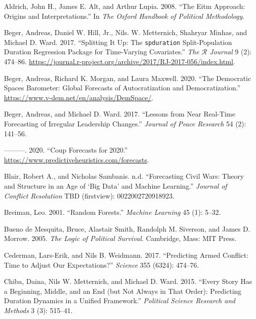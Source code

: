 \documentclass[
]{article}
\newlength{\cslhangindent}
\newenvironment{cslreferences}%
  {\setlength{\parindent}{0pt}%
  \everypar{\setlength{\hangindent}{\cslhangindent}}\ignorespaces}%
  {\par}
\begin{document}
\hypertarget{refs}{}
\begin{cslreferences}
\leavevmode\hypertarget{ref-aldrich:etal:2008}{}%
Aldrich, John H., James E. Alt, and Arthur Lupia. 2008. ``The Eitm Approach: Origins and Interpretations.'' In \emph{The Oxford Handbook of Political Methodology}.

\leavevmode\hypertarget{ref-beger:etal:2017}{}%
Beger, Andreas, Daniel W. Hill, Jr., Nils. W. Metternich, Shahryar Minhas, and Michael D. Ward. 2017. ``Splitting It Up: The \texttt{spduration} Split-Population Duration Regression Package for Time-Varying Covariates.'' \emph{The \(\mathcal{R}\) Journal} 9 (2): 474--86. \url{https://journal.r-project.org/archive/2017/RJ-2017-056/index.html}.

\leavevmode\hypertarget{ref-beger:etal:2020}{}%
Beger, Andreas, Richard K. Morgan, and Laura Maxwell. 2020. ``The Democratic Spaces Barometer: Global Forecasts of Autocratization and Democratization.'' \url{https://www.v-dem.net/en/analysis/DemSpace/}.

\leavevmode\hypertarget{ref-beger:ward:2017}{}%
Beger, Andreas, and Michael D. Ward. 2017. ``Lessons from Near Real-Time Forecasting of Irregular Leadership Changes.'' \emph{Journal of Peace Research} 54 (2): 141--56.

\leavevmode\hypertarget{ref-beger:ward:2020}{}%
---------. 2020. ``Coup Forecasts for 2020.'' \url{https://www.predictiveheuristics.com/forecasts}.

\leavevmode\hypertarget{ref-blair:sambanis:2020}{}%
Blair, Robert A., and Nicholas Sambanis. n.d. ``Forecasting Civil Wars: Theory and Structure in an Age of `Big Data' and Machine Learning.'' \emph{Journal of Conflict Resolution} TBD (firstview): 0022002720918923.

\leavevmode\hypertarget{ref-breiman:2001}{}%
Breiman, Leo. 2001. ``Random Forests.'' \emph{Machine Learning} 45 (1): 5--32.

\leavevmode\hypertarget{ref-bdm:etal:2005}{}%
Bueno de Mesquita, Bruce, Alastair Smith, Randolph M. Siverson, and James D. Morrow. 2005. \emph{The Logic of Political Survival}. Cambridge, Mass: MIT Press.

\leavevmode\hypertarget{ref-cederman:weidmann:2017}{}%
Cederman, Lars-Erik, and Nils B. Weidmann. 2017. ``Predicting Armed Conflict: Time to Adjust Our Expectations?'' \emph{Science} 355 (6324): 474--76.

\leavevmode\hypertarget{ref-chiba:etal:2015}{}%
Chiba, Daina, Nils W. Metternich, and Michael D. Ward. 2015. ``Every Story Has a Beginning, Middle, and an End (but Not Always in That Order): Predicting Duration Dynamics in a Unified Framework.'' \emph{Political Science Research and Methods} 3 (3): 515--41.


\end{cslreferences}
\end{document}
